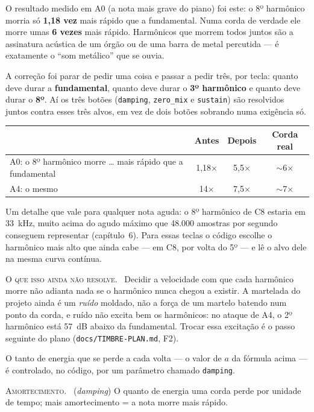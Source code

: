 \documentclass[11pt,oneside]{book}
\newcommand{\nova}[1]{\textsc{\color{accent}#1.}~}
\begin{document}
O resultado medido em A0 (a nota mais grave do piano) foi este: o 8º
harmônico morria só \textbf{1,18 vez} mais rápido que a fundamental. Numa
corda de verdade ele morre umas \textbf{6 vezes} mais rápido. Harmônicos que
morrem todos juntos são a assinatura acústica de um órgão ou de uma barra de
metal percutida --- é exatamente o \enquote{som metálico} que se ouvia.

A correção foi parar de pedir uma coisa e passar a pedir três, por tecla:
quanto deve durar a \textbf{fundamental}, quanto deve durar o \textbf{3º
harmônico} e quanto deve durar o \textbf{8º}. Aí os três botões
(\texttt{damping}, \texttt{zero\_mix} e \texttt{sustain}) são resolvidos
juntos contra esses três alvos, em vez de dois botões sobrando numa
exigência só.

\begin{center}
\begin{tabular}{lccc}
\toprule
& Antes & Depois & Corda real \\
\midrule
A0: o 8º harmônico morre \ldots{} mais rápido que a fundamental & 1,18$\times$ & 5,5$\times$ & $\sim$6$\times$ \\
A4: o mesmo & 14$\times$ & 7,5$\times$ & $\sim$7$\times$ \\
\bottomrule
\end{tabular}
\end{center}

Um detalhe que vale para qualquer nota aguda: o 8º harmônico de C8 estaria
em 33~kHz, muito acima do agudo máximo que 48.000 amostras por segundo
conseguem representar (capítulo~6). Para essas teclas o código escolhe o
harmônico mais alto que ainda cabe --- em C8, por volta do 5º --- e lê o
alvo dele na mesma curva contínua.

\begin{newword}
\nova{O que isso ainda não resolve} Decidir a velocidade com que cada
harmônico morre não adianta nada se o harmônico nunca chegou a existir. A
martelada do projeto ainda é um \emph{ruído} moldado, não a força de um
martelo batendo num ponto da corda, e ruído não excita bem os harmônicos: no
ataque de A4, o 2º harmônico está 57~dB abaixo da fundamental. Trocar essa
excitação é o passo seguinte do plano (\texttt{docs/TIMBRE-PLAN.md}, F2).
\end{newword}

O tanto de energia que se perde a cada volta --- o valor de $a$ da fórmula
acima --- é controlado, no código, por um parâmetro chamado
\texttt{damping}.

\begin{newword}
\nova{Amortecimento} (\emph{damping}) O quanto de energia uma corda perde
por unidade de tempo; mais amortecimento = a nota morre mais rápido.
\end{newword}
\end{document}
